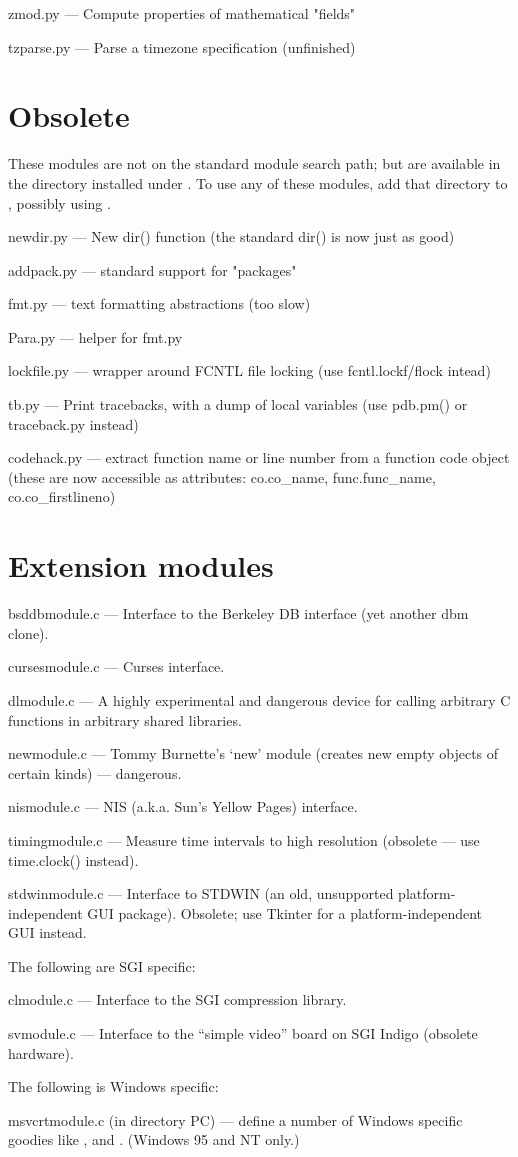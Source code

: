 zmod.py --- Compute properties of mathematical "fields"

tzparse.py --- Parse a timezone specification (unfinished)


\section{Obsolete}

These modules are not on the standard module search path;
but are available in the directory  installed  under
.  To use any of these
modules, add that directory to , possibly using
.

newdir.py --- New dir() function (the standard dir() is now just as good)

addpack.py --- standard support for "packages"

fmt.py --- text formatting abstractions (too slow)

Para.py --- helper for fmt.py

lockfile.py --- wrapper around FCNTL file locking (use
fcntl.lockf/flock intead)

tb.py --- Print tracebacks, with a dump of local variables (use
pdb.pm() or traceback.py instead)

codehack.py --- extract function name or line number from a function
code object (these are now accessible as attributes: co.co_name,
func.func_name, co.co_firstlineno)


\section{Extension modules}

bsddbmodule.c --- Interface to the Berkeley DB interface (yet another
dbm clone).

cursesmodule.c --- Curses interface.

dlmodule.c ---  A highly experimental and dangerous device for calling
arbitrary C functions in arbitrary shared libraries.

newmodule.c --- Tommy Burnette's `new' module (creates new empty
objects of certain kinds) --- dangerous.

nismodule.c --- NIS (a.k.a. Sun's Yellow Pages) interface.

timingmodule.c --- Measure time intervals to high resolution (obsolete
--- use time.clock() instead).

stdwinmodule.c --- Interface to STDWIN (an old, unsupported
platform-independent GUI package).  Obsolete; use Tkinter for a
platform-independent GUI instead.

The following are SGI specific:

clmodule.c --- Interface to the SGI compression library.

svmodule.c --- Interface to the ``simple video'' board on SGI Indigo
(obsolete hardware).

The following is Windows specific:

msvcrtmodule.c (in directory PC) --- define a number of Windows
specific goodies like ,  and
.  (Windows 95 and NT only.)

